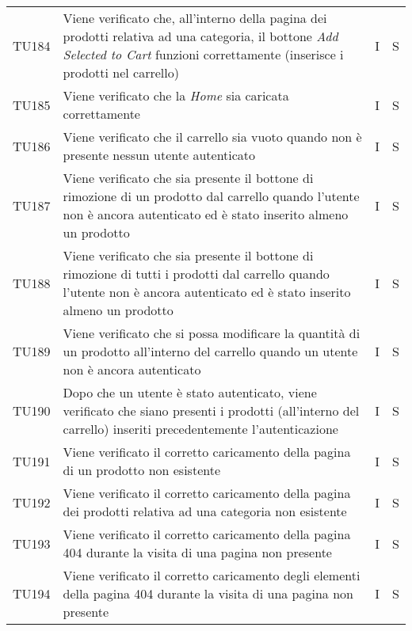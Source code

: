 {\begin{longtable}{C{2cm} C{9.6cm} C{1.5cm} C{1cm}}
TU184 & Viene verificato che, all'interno della pagina dei prodotti relativa ad una categoria, il bottone \textit{Add Selected to Cart} funzioni correttamente (inserisce i prodotti nel carrello) & I & S\\

TU185 & Viene verificato che la \textit{Home} sia caricata correttamente & I & S\\

TU186 & Viene verificato che il carrello sia vuoto quando non è presente nessun utente autenticato & I & S\\

TU187 & Viene verificato che sia presente il bottone di rimozione di un prodotto dal carrello quando l'utente non è ancora autenticato ed è stato inserito almeno un prodotto & I & S\\

TU188 & Viene verificato che sia presente il bottone di rimozione di tutti i prodotti dal carrello quando l'utente non è ancora autenticato ed è stato inserito almeno un prodotto & I & S\\

TU189 & Viene verificato che si possa modificare la quantità di un prodotto all'interno del carrello quando un utente non è ancora autenticato & I & S\\

TU190 & Dopo che un utente è stato autenticato, viene verificato che siano presenti i prodotti (all'interno del carrello) inseriti precedentemente l'autenticazione & I & S\\

TU191 & Viene verificato il corretto caricamento della pagina di un prodotto non esistente & I & S\\

TU192 & Viene verificato il corretto caricamento della pagina dei prodotti relativa ad una categoria non esistente & I & S\\

TU193 & Viene verificato il corretto caricamento della pagina 404 durante la visita di una pagina non presente & I & S\\

TU194 & Viene verificato il corretto caricamento degli elementi della pagina 404 durante la visita di una pagina non presente & I & S\\

\end{longtable}

}

